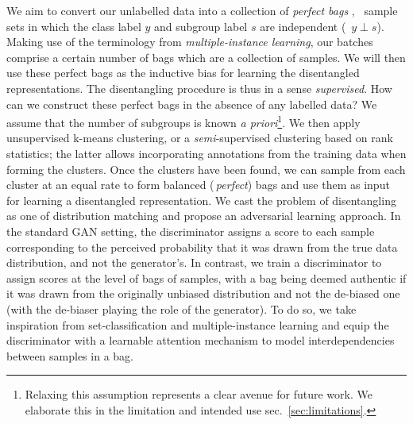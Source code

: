 We aim to convert our unlabelled data into a collection of \emph{perfect bags} \citep{kleinberg2016inherent,chouldechova2017fair}, \ie\ sample sets in which the class label $y$ and subgroup label $s$ are independent (\ie\ $y\perp s$).
Making use of the terminology from \emph{multiple-instance learning}, our batches comprise a certain number of bags which are a collection of samples.
%
We will then use these perfect bags as the inductive bias for learning the disentangled representations. 
The disentangling procedure is thus in a sense \emph{supervised}.
%
How can we construct these perfect bags in the absence of any labelled data?
%
We assume that the number of subgroups is known \emph{a priori}\footnote{Relaxing this assumption represents a clear avenue for future work. We elaborate this in the limitation and intended use sec.~\ref{sec:limitations}.}. 
%
We then apply unsupervised k-means clustering, or a \emph{semi}-supervised clustering based on rank statistics; the latter allows incorporating annotations from the training data when forming the clusters.
%
Once the clusters have been found, we can sample from each cluster at an equal rate to form balanced (\ie\,\emph{perfect}) bags and use them as input for learning a disentangled representation. 
%
We cast the problem of disentangling as one of distribution matching and propose an adversarial learning approach.
In the standard GAN setting, the discriminator assigns a score to each sample corresponding to the perceived probability that it was drawn from the true data distribution, and not the generator's.
In contrast, we train a discriminator to assign scores at the level of bags of samples, with a bag being deemed authentic if it was drawn from the originally unbiased distribution and not the de-biased one (with the de-biaser playing the role of the generator). To do so, we take inspiration from set-classification and multiple-instance learning and equip the discriminator with a learnable attention mechanism to model interdependencies between samples in a bag.


